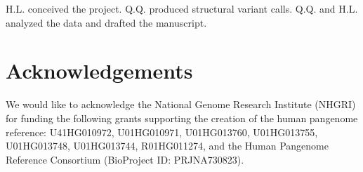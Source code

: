 \documentclass[a4paper,num-refs]{oup-contemporary}
\begin{document}
H.L. conceived the project.
Q.Q. produced structural variant calls.
Q.Q. and H.L. analyzed the data and drafted the manuscript.

\section{Acknowledgements}

We would like to acknowledge the National Genome Research Institute (NHGRI) for
funding the following grants supporting the creation of the human pangenome
reference: U41HG010972, U01HG010971, U01HG013760, U01HG013755, U01HG013748,
U01HG013744, R01HG011274, and the Human Pangenome Reference Consortium
(BioProject ID: PRJNA730823).


\end{document}

